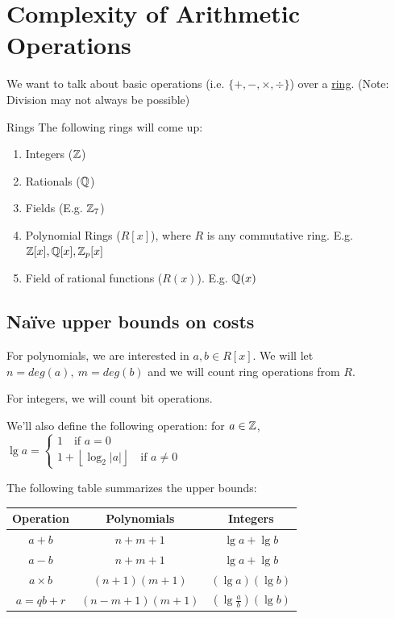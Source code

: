 
\section{Complexity of Arithmetic Operations}

We want to talk about basic operations (i.e. $\{+, -, \times, \div \}$) over a \ul{ring}. (Note: Division may not always be possible)

\begin{example}{Rings}{}
    The following rings will come up:
    \begin{enumerate}
        \item Integers ($\operatorname{\mathbb{Z}}$)
        \item Rationals ($\operatorname{\mathbb{Q}}$)
        \item Fields (E.g. $\operatorname{\mathbb{Z}}_7$)
        \item Polynomial Rings ($R[x]$), where $R$ is any commutative ring. E.g. $\operatorname{\mathbb{Z}}[x], \operatorname{\mathbb{Q}}[x], \operatorname{\mathbb{Z}}_p[x]$
        \item Field of rational functions ($R(x)$). E.g. $\operatorname{\mathbb{Q}}(x)$
    \end{enumerate}
\end{example}

\subsection{Naïve upper bounds on costs}
For polynomials, we are interested in $a,b \in R[x]$. We will let $n = deg(a),\ m = deg(b)$ and we will count ring operations from $R$.

For integers, we will count bit operations.

We'll also define the following operation: for $a \in \operatorname{\mathbb{Z}}$, $\lg a = \begin{cases}1 \quad \text{if } a = 0 \\ 1 + \left \lfloor \log_2 |a| \right\rfloor \quad \text{if } a \neq 0 \end{cases}$

The following table summarizes the upper bounds:
\begin{center}
\begin{tabular}{c|c|c}
    Operation & Polynomials & Integers \\
    \hline
    $a + b$ & $n + m + 1$ & $\lg a + \lg b$\\
    $a - b$ & $n + m + 1$ & $\lg a + \lg b$\\
    $a \times b$ & $(n+1)(m+1)$ & $(\lg a)(\lg b)$\\
    $a = qb + r$ & $(n-m+1)(m+1)$ & $(\lg \frac{a}{b})(\lg b)$
\end{tabular}
\end{center}

